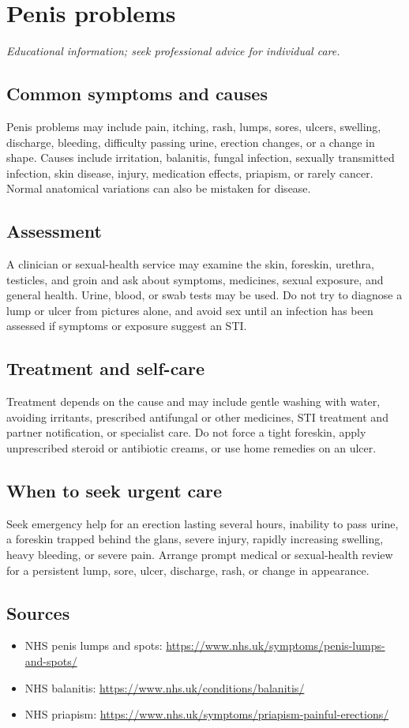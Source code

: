 \chapter{Penis problems}

\medskip
\noindent\textit{Educational information; seek professional advice for individual care.}

\section*{Common symptoms and causes}
Penis problems may include pain, itching, rash, lumps, sores, ulcers, swelling, discharge, bleeding, difficulty passing urine, erection changes, or a change in shape. Causes include irritation, balanitis, fungal infection, sexually transmitted infection, skin disease, injury, medication effects, priapism, or rarely cancer. Normal anatomical variations can also be mistaken for disease.

\section*{Assessment}
A clinician or sexual-health service may examine the skin, foreskin, urethra, testicles, and groin and ask about symptoms, medicines, sexual exposure, and general health. Urine, blood, or swab tests may be used. Do not try to diagnose a lump or ulcer from pictures alone, and avoid sex until an infection has been assessed if symptoms or exposure suggest an STI.

\section*{Treatment and self-care}
Treatment depends on the cause and may include gentle washing with water, avoiding irritants, prescribed antifungal or other medicines, STI treatment and partner notification, or specialist care. Do not force a tight foreskin, apply unprescribed steroid or antibiotic creams, or use home remedies on an ulcer.

\section*{When to seek urgent care}
Seek emergency help for an erection lasting several hours, inability to pass urine, a foreskin trapped behind the glans, severe injury, rapidly increasing swelling, heavy bleeding, or severe pain. Arrange prompt medical or sexual-health review for a persistent lump, sore, ulcer, discharge, rash, or change in appearance.

\section*{Sources}
\begin{itemize}
\item NHS penis lumps and spots: \url{https://www.nhs.uk/symptoms/penis-lumps-and-spots/}
\item NHS balanitis: \url{https://www.nhs.uk/conditions/balanitis/}
\item NHS priapism: \url{https://www.nhs.uk/symptoms/priapism-painful-erections/}
\end{itemize}
